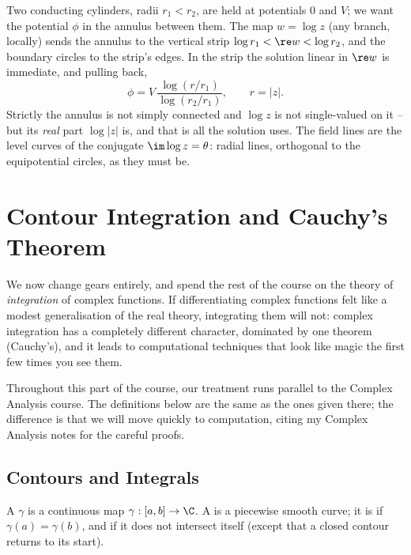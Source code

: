 \begin{example}
	Two conducting cylinders, radii $r_1 < r_2$, are held at potentials $0$ and $V$; we want the potential $\phi$ in the annulus between them. The map $w = \log z$ (any branch, locally) sends the annulus to the vertical strip $\log r_1 < \re w < \log r_2$, and the boundary circles to the strip's edges. In the strip the solution linear in $\re w$ is immediate, and pulling back,
	$$
	\phi = V \, \frac{\log(r/r_1)}{\log(r_2/r_1)}, \qquad r = |z|.
	$$
	Strictly the annulus is not simply connected and $\log z$ is not single-valued on it -- but its \emph{real} part $\log |z|$ is, and that is all the solution uses. The field lines are the level curves of the conjugate $\im \log z = \theta$: radial lines, orthogonal to the equipotential circles, as they must be.
\end{example}

\section{Contour Integration and Cauchy's Theorem}

We now change gears entirely, and spend the rest of the course on the theory of \emph{integration} of complex functions. If differentiating complex functions felt like a modest generalisation of the real theory, integrating them will not: complex integration has a completely different character, dominated by one theorem (Cauchy's), and it leads to computational techniques that look like magic the first few times you see them.

Throughout this part of the course, our treatment runs parallel to the Complex Analysis course. The definitions below are the same as the ones given there; the difference is that we will move quickly to computation, citing my Complex Analysis notes for the careful proofs.

\subsection{Contours and Integrals}

\begin{definition}[Contour]
	A  $\gamma$ is a continuous map $\gamma : [a, b] \to \C$. A  is a piecewise smooth curve; it is  if $\gamma(a) = \gamma(b)$, and  if it does not intersect itself (except that a closed contour returns to its start).
\end{definition}

